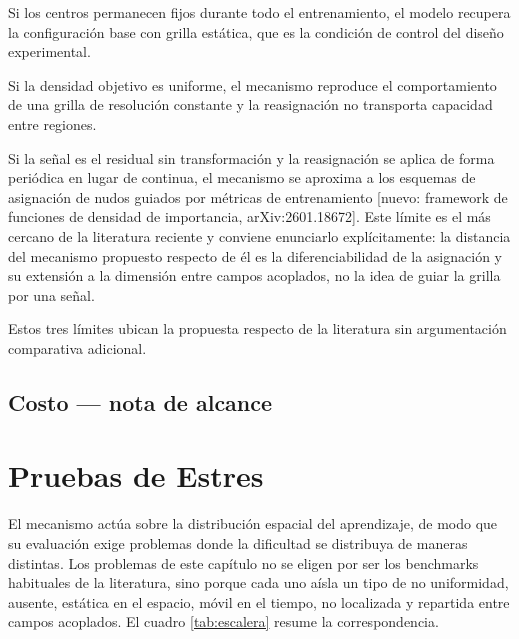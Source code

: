 Si los centros permanecen fijos durante todo el entrenamiento, el modelo recupera la configuración base con grilla estática, que es la condición de control del diseño experimental.

Si la densidad objetivo es uniforme, el mecanismo reproduce el comportamiento de una grilla de resolución constante y la reasignación no transporta capacidad entre regiones.

Si la señal es el residual sin transformación y la reasignación se aplica de forma periódica en lugar de continua, el mecanismo se aproxima a los esquemas de asignación de nudos guiados por métricas de entrenamiento [nuevo: framework de funciones de densidad de importancia, arXiv:2601.18672]. Este límite es el más cercano de la literatura reciente y conviene enunciarlo explícitamente: la distancia del mecanismo propuesto respecto de él es la diferenciabilidad de la asignación y su extensión a la dimensión entre campos acoplados, no la idea de guiar la grilla por una señal.

Estos tres límites ubican la propuesta respecto de la literatura sin argumentación comparativa adicional.

\subsection{Costo — nota de alcance}


\section{Pruebas de Estres}

El mecanismo actúa sobre la distribución espacial del aprendizaje, de
modo que su evaluación exige problemas donde la dificultad se distribuya
de maneras distintas. Los problemas de este capítulo no se eligen por ser
los benchmarks habituales de la literatura, sino porque cada uno aísla un
tipo de no uniformidad,  ausente, estática en el espacio, móvil en el
tiempo, no localizada y repartida entre campos acoplados. El cuadro
\ref{tab:escalera} resume la correspondencia.

